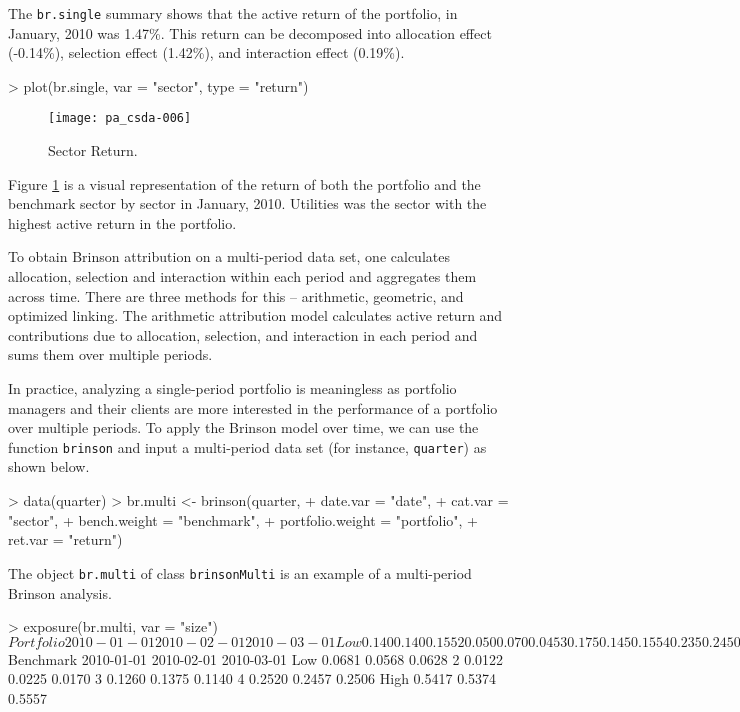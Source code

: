 The \texttt{br.single} summary shows that the active return of the
portfolio, in January, 2010 was 1.47\%. This return can be decomposed
into allocation effect (-0.14\%), selection effect (1.42\%), and
interaction effect (0.19\%).
\begin{smallverbatim}
> plot(br.single, var = "sector", type = "return")
\end{smallverbatim}
\begin{figure}
\centering
\vspace*{.1in}
\texttt{[image: pa\_csda-006]}
\caption{\label{figure:return}
  Sector Return.}
\end{figure}

Figure \ref{figure:return} is a visual representation of the return of
both the portfolio and the benchmark sector by sector in January,
2010. Utilities was the
sector with the highest active return in the portfolio.

To obtain Brinson attribution on a multi-period data set, one
calculates allocation, selection and interaction within each period
and aggregates them across time. There are three methods for this --
arithmetic, geometric, and optimized linking. The arithmetic attribution model
calculates active return and contributions due to allocation,
selection, and interaction in each period and sums them over multiple
periods. 

In practice, analyzing a single-period portfolio is meaningless as
portfolio managers and their clients are more interested in the
performance of a portfolio over multiple periods. To apply the Brinson
model over time, we can use the function \texttt{brinson} and input a
multi-period data set (for instance, \texttt{quarter}) as shown
below. 

\begin{smallverbatim}
> data(quarter)
> br.multi <- brinson(quarter,
+           date.var = "date",
+           cat.var = "sector",
+           bench.weight = "benchmark",
+           portfolio.weight = "portfolio",
+           ret.var = "return")
\end{smallverbatim}
The object \texttt{br.multi} of class \texttt{brinsonMulti} is an
example of a multi-period Brinson analysis.
\begin{smallverbatim}
> exposure(br.multi, var = "size")
$Portfolio
     2010-01-01 2010-02-01 2010-03-01
Low       0.140      0.140      0.155
2         0.050      0.070      0.045
3         0.175      0.145      0.155
4         0.235      0.245      0.240
High      0.400      0.400      0.405

$Benchmark
     2010-01-01 2010-02-01 2010-03-01
Low      0.0681     0.0568     0.0628
2        0.0122     0.0225     0.0170
3        0.1260     0.1375     0.1140
4        0.2520     0.2457     0.2506
High     0.5417     0.5374     0.5557
\end{smallverbatim}


